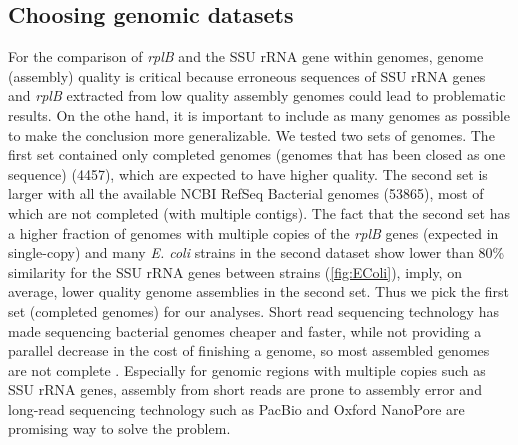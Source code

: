 \documentclass[]{msu-thesis}
\begin{document}
\subsection{Choosing genomic datasets}
For the comparison of \textit{rplB} and the SSU rRNA gene within genomes, genome (assembly) quality is critical because erroneous sequences of SSU rRNA genes and \textit{rplB} extracted from low quality assembly genomes could lead to problematic results. On the othe hand, it is important to include as many genomes as possible to make the conclusion more generalizable. We tested two sets of genomes. The first set contained only completed genomes (genomes that has been closed as one sequence) (4457), which are expected to have higher quality. The second set is larger with all the available NCBI RefSeq Bacterial genomes (53865), most of which are not completed (with multiple contigs). The fact that the second set has a higher fraction of genomes with multiple copies of the \textit{rplB} genes (expected in single-copy) and many \textit{E. coli} strains in the second dataset show lower than 80\% similarity for the SSU rRNA genes between strains (\cref{fig:EColi}), imply, on average, lower quality genome assemblies in the second set. Thus we pick the first set (completed genomes) for our analyses. Short read sequencing technology has made sequencing bacterial genomes cheaper and faster, while not providing a parallel decrease in the cost of finishing a genome, so most assembled genomes are not complete \cite{land_insights_2015}. Especially for genomic regions with multiple copies such as SSU rRNA genes, assembly from short reads are prone to assembly error and long-read sequencing technology such as PacBio and Oxford NanoPore  are promising way to solve the problem.


\end{document}
